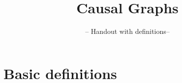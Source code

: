 

\usepackage{graphicx}
\newcommand\sbullet[1][.5]{\mathbin{\vcenter{\hbox{\scalebox{#1}{$\bullet$}}}}}
\usepackage[export]{adjustbox}

\title{Causal Graphs}
\subtitle{-- Handout with definitions--}
\date{}

\maketitle\vspace{-2cm}

\section*{Basic definitions} 

